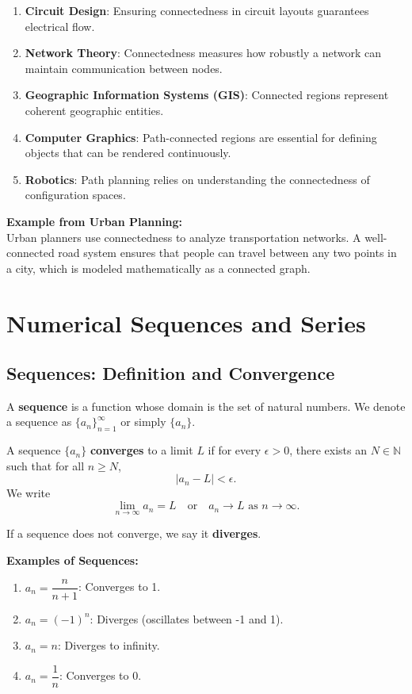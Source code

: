 \documentclass{article}
\begin{document}
\begin{enumerate}[label=\textbf{\arabic*.}]
    \item \textbf{Circuit Design}: Ensuring connectedness in circuit layouts guarantees electrical flow.
    \item \textbf{Network Theory}: Connectedness measures how robustly a network can maintain communication between nodes.
    \item \textbf{Geographic Information Systems (GIS)}: Connected regions represent coherent geographic entities.
    \item \textbf{Computer Graphics}: Path-connected regions are essential for defining objects that can be rendered continuously.
    \item \textbf{Robotics}: Path planning relies on understanding the connectedness of configuration spaces.
\end{enumerate}

\textbf{Example from Urban Planning:} \\
Urban planners use connectedness to analyze transportation networks. A well-connected road system ensures that people can travel between any two points in a city, which is modeled mathematically as a connected graph.

\bigskip

\section{Numerical Sequences and Series} \label{sequences-series}

\subsection{Sequences: Definition and Convergence} \label{sequences-definition}

A \textbf{sequence} is a function whose domain is the set of natural numbers. We denote a sequence as $\{a_n\}_{n=1}^{\infty}$ or simply $\{a_n\}$.

A sequence $\{a_n\}$ \textbf{converges} to a limit $L$ if for every $\epsilon > 0$, there exists an $N \in \mathbb{N}$ such that for all $n \geq N$, 
\[
|a_n - L| < \epsilon.
\]
We write 
\[
\lim_{n \to \infty} a_n = L \quad \text{or} \quad a_n \to L \text{ as } n \to \infty.
\]

If a sequence does not converge, we say it \textbf{diverges}.

\textbf{Examples of Sequences:}
\begin{enumerate}[label=\textbf{\arabic*.}]
    \item $a_n = \dfrac{n}{n+1}$: Converges to 1.
    \item $a_n = (-1)^n$: Diverges (oscillates between -1 and 1).
    \item $a_n = n$: Diverges to infinity.
    \item $a_n = \dfrac{1}{n}$: Converges to 0.
\end{enumerate}
\end{document}
